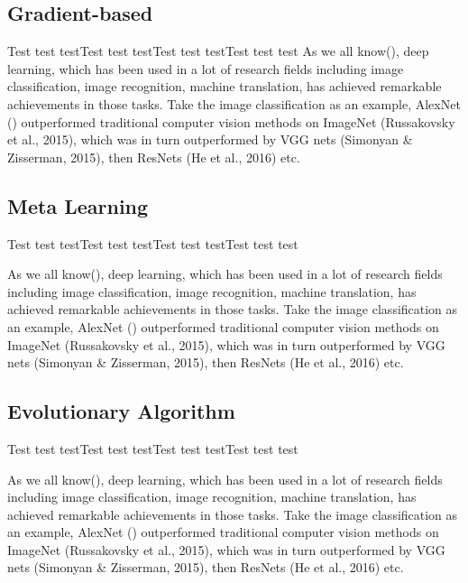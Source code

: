 \documentclass[a4paper, 10pt, conference]{ieeeconf}
\begin{document}
\subsection{Gradient-based}

Test test testTest test testTest test testTest test test
As we all know(\cite{xie_genetic_2017}), deep learning, which has been used in a lot of research fields including image classification, image recognition, machine translation, has achieved remarkable achievements in those tasks. Take the image classification as an example, AlexNet () outperformed traditional computer vision methods on ImageNet (Russakovsky et al., 2015), which was in turn outperformed by VGG nets (Simonyan \& Zisserman, 2015), then ResNets (He et al., 2016) etc.




\subsection{Meta Learning}

Test test testTest test testTest test testTest test test

As we all know(\cite{xie_genetic_2017}), deep learning, which has been used in a lot of research fields including image classification, image recognition, machine translation, has achieved remarkable achievements in those tasks. Take the image classification as an example, AlexNet () outperformed traditional computer vision methods on ImageNet (Russakovsky et al., 2015), which was in turn outperformed by VGG nets (Simonyan \& Zisserman, 2015), then ResNets (He et al., 2016) etc.





\subsection{Evolutionary Algorithm}
Test test testTest test testTest test testTest test test


As we all know(\cite{xie_genetic_2017}), deep learning, which has been used in a lot of research fields including image classification, image recognition, machine translation, has achieved remarkable achievements in those tasks. Take the image classification as an example, AlexNet () outperformed traditional computer vision methods on ImageNet (Russakovsky et al., 2015), which was in turn outperformed by VGG nets (Simonyan \& Zisserman, 2015), then ResNets (He et al., 2016) etc.
\end{document}
